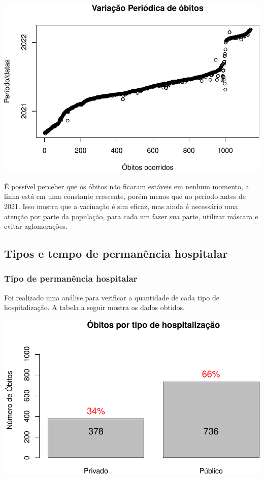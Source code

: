 \documentclass[
]{article}
\begin{document}
\includegraphics{tf-matheus-willian_files/figure-latex/unnamed-chunk-3-1.pdf}

É possível perceber que os óbitos não ficaram estáveis em nenhum
momento, a linha está em uma constante crescente, porém menos que no
período antes de 2021. Isso mostra que a vacinação é sim eficaz, mas
ainda é necessário uma atenção por parte da população, para cada um
fazer sua parte, utilizar máscara e evitar aglomerações.

\hypertarget{tipos-e-tempo-de-permanuxeancia-hospitalar}{%
\subsection{Tipos e tempo de permanência
hospitalar}\label{tipos-e-tempo-de-permanuxeancia-hospitalar}}

\hypertarget{tipo-de-permanuxeancia-hospitalar}{%
\subsubsection{Tipo de permanência
hospitalar}\label{tipo-de-permanuxeancia-hospitalar}}

Foi realizado uma análise para verificar a quantidade de cada tipo de
hospitalização. A tabela a seguir mostra os dados obtidos.

\includegraphics{tf-matheus-willian_files/figure-latex/unnamed-chunk-4-1.pdf}
\end{document}
